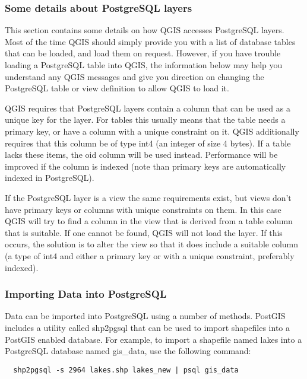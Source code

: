 \subsubsection{Some details about PostgreSQL
layers}\label{sec:postgis_details}

This section contains some details on how QGIS accesses PostgreSQL
layers. Most of the time QGIS should simply provide you with a list of
database tables that can be loaded, and load them on request. However,
if you have trouble loading a PostgreSQL table into QGIS, the information
below may help you understand any QGIS messages and give you direction on
changing the PostgreSQL table or view definition to allow QGIS to load it.

QGIS requires that PostgreSQL layers contain a column that can be
used as a unique key for the layer. For tables this usually means
that the table needs a primary key, or have a column with a unique
constraint on it. QGIS additionally requires that this column be of
type int4 (an integer of size 4 bytes). If a table lacks these items,
the oid column will be used instead. Performance will be improved if the
column is indexed (note than primary keys are automatically indexed in
PostgreSQL). 

If the PostgreSQL layer is a view the same requirements exist, but
views don't have primary keys or columns with unique constraints on
them. In this case QGIS will try to find a column in the view that is
derived from a table column that is suitable. If one cannot be found,
QGIS will not load the layer. If this occurs, the solution is to alter
the view so that it does include a suitable column (a type of int4
and either a primary key or with a unique constraint, preferably indexed).

\subsubsection{Importing Data into PostgreSQL}\label{sec:loading_postgis_data}

Data can be imported into PostgreSQL using a number of methods. PostGIS
includes a utility called shp2pgsql that can be used to import shapefiles into
a PostGIS enabled database. For example, to import a shapefile named lakes 
into a PostgreSQL database named gis\_data, use the following command:

\begin{verbatim} 
  shp2pgsql -s 2964 lakes.shp lakes_new | psql gis_data
\end{verbatim}

